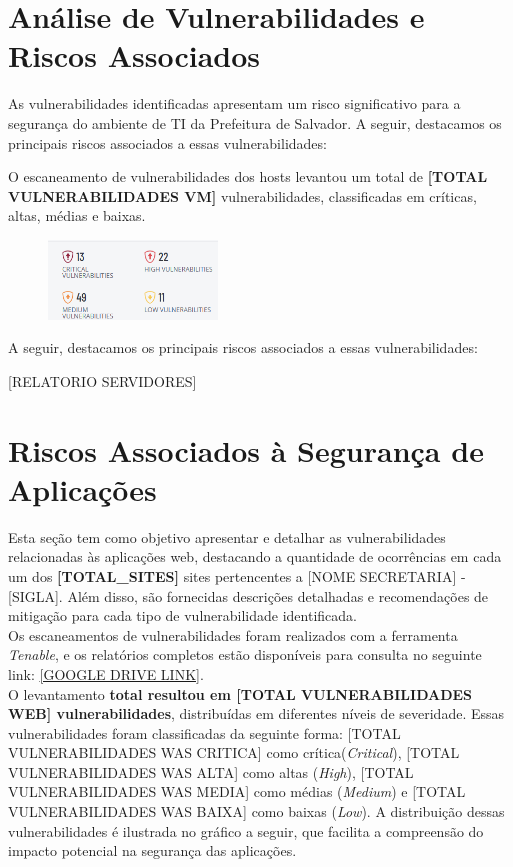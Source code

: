 \documentclass[a4paper,12pt]{article}
\begin{document}
\section{Análise de Vulnerabilidades e Riscos Associados}
As vulnerabilidades identificadas apresentam um risco significativo para a segurança do ambiente de TI da Prefeitura de Salvador. A seguir, destacamos os principais riscos associados a essas vulnerabilidades:

O escaneamento de vulnerabilidades dos hosts levantou um total de \textbf{[TOTAL VULNERABILIDADES VM]} vulnerabilidades, classificadas em críticas, altas, médias e baixas.

   \begin{figure}[h!]
    \centering
    \includegraphics[width=0.4\textwidth]{assets/images-vmscan/Total_Vulnerabilidades.png} 
    \end{figure}
    \FloatBarrier

A seguir, destacamos os principais riscos associados a essas vulnerabilidades: 

[RELATORIO SERVIDORES]

\section{Riscos Associados à Segurança de Aplicações}

Esta seção tem como objetivo apresentar e detalhar as vulnerabilidades relacionadas às aplicações web, destacando a quantidade de ocorrências em cada um dos \textbf{[TOTAL_SITES]} sites pertencentes a [NOME SECRETARIA] - [SIGLA]. Além disso, são fornecidas descrições detalhadas e recomendações de mitigação para cada tipo de vulnerabilidade identificada.\\

Os escaneamentos de vulnerabilidades foram realizados com a ferramenta \textit{Tenable}, e os relatórios completos estão disponíveis para consulta no seguinte link: \url{[GOOGLE DRIVE LINK]}.\\

O levantamento \textbf{total resultou em [TOTAL VULNERABILIDADES WEB] vulnerabilidades}, distribuídas em diferentes níveis de severidade. Essas vulnerabilidades foram classificadas da seguinte forma: [TOTAL VULNERABILIDADES WAS CRITICA] como crítica(\textit{Critical}), [TOTAL VULNERABILIDADES WAS ALTA] como altas (\textit{High}), [TOTAL VULNERABILIDADES WAS MEDIA] como médias (\textit{Medium}) e [TOTAL VULNERABILIDADES WAS BAIXA] como baixas (\textit{Low}). A distribuição dessas vulnerabilidades é ilustrada no gráfico a seguir, que facilita a compreensão do impacto potencial na segurança das aplicações.
\end{document}
